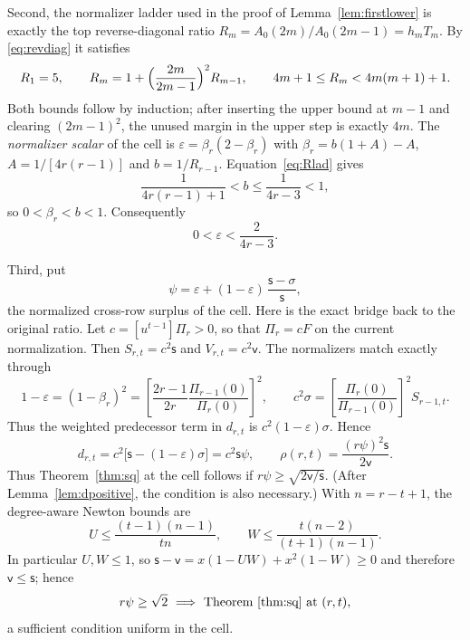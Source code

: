 \documentclass[11pt,a4paper]{article}
\theoremstyle{plain}
\theoremstyle{definition}
\theoremstyle{remark}
\newcommand{\ls}{\mathsf{s}}
\newcommand{\lv}{\mathsf{v}}
\begin{document}
Second, the normalizer ladder used in the proof of
Lemma~\ref{lem:firstlower} is exactly the top reverse-diagonal ratio
$R_m=A_0(2m)/A_0(2m-1)=h_mT_m$. By \eqref{eq:revdiag} it satisfies
\begin{equation}\label{eq:Rlad}
  R_1=5,\qquad R_m=1+\Bigl(\frac{2m}{2m-1}\Bigr)^{2}R_{m-1},
  \qquad 4m+1\le R_m<4m(m+1)+1 .
\end{equation}
Both bounds follow by induction; after inserting the upper bound at $m-1$ and
clearing $(2m-1)^2$, the unused margin in the upper step is exactly $4m$.
The \emph{normalizer scalar} of the cell is
$\varepsilon=\beta_r(2-\beta_r)$ with $\beta_r=b(1+A)-A$, $A=1/[4r(r-1)]$ and
$b=1/R_{r-1}$. Equation~\eqref{eq:Rlad} gives
\[
 \frac{1}{4r(r-1)+1}<b\le\frac{1}{4r-3}<1,
\]
so $0<\beta_r<b<1$. Consequently
\begin{equation}\label{eq:EPS}
  0<\varepsilon<\frac{2}{4r-3}.
\end{equation}

Third, put
\begin{equation}\label{eq:psi}
  \psi=\varepsilon+(1-\varepsilon)\,\frac{\ls-\sigma}{\ls},
\end{equation}
the normalized cross-row surplus of the cell. Here is the exact bridge back to
the original ratio. Let $c=[u^{t-1}]\Pi_r>0$, so that $\Pi_r=cF$ on the current
normalization. Then $S_{r,t}=c^2\ls$ and $V_{r,t}=c^2\lv$. The normalizers
match exactly through
\[
 1-\varepsilon=(1-\beta_r)^2
 =\left[\frac{2r-1}{2r}\frac{\Pi_{r-1}(0)}{\Pi_r(0)}\right]^2,
 \qquad
 c^2\sigma=\left[\frac{\Pi_r(0)}{\Pi_{r-1}(0)}\right]^2S_{r-1,t}.
\]
Thus the weighted predecessor term in $d_{r,t}$ is
$c^2(1-\varepsilon)\sigma$. Hence
\begin{equation}\label{eq:rholocal}
  d_{r,t}=c^2\bigl[\ls-(1-\varepsilon)\sigma\bigr]=c^2\ls\psi,
  \qquad
  \rho(r,t)=\frac{(r\psi)^2\ls}{2\lv}.
\end{equation}
Thus Theorem~\ref{thm:sq} at the cell follows if
$r\psi\ge\sqrt{2\lv/\ls}$. (After Lemma~\ref{lem:dpositive}, the condition is
also necessary.) With $n=r-t+1$, the degree-aware Newton bounds are
\begin{equation}\label{eq:newtonlocal}
 U\le\frac{(t-1)(n-1)}{tn},\qquad
 W\le\frac{t(n-2)}{(t+1)(n-1)}.
\end{equation}
In particular $U,W\le1$, so
$\ls-\lv=x(1-UW)+x^2(1-W)\ge0$ and therefore $\lv\le\ls$; hence
\begin{equation}\label{eq:sufficient}
  r\psi\ge\sqrt2\ \Longrightarrow\ \text{Theorem~\ref{thm:sq} at }(r,t),
\end{equation}
a sufficient condition uniform in the cell.
\end{document}
